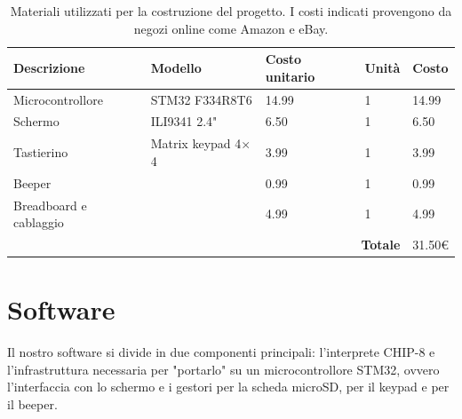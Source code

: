 \documentclass[a4paper]{article}
\begin{document}
    \begin{table}[h] %
        \centering
        \begin{tabular}{|llll|l|}
            \hline
            \multicolumn{1}{|l|}{\textbf{Descrizione}}          & \multicolumn{1}{l|}{\textbf{Modello}}       & \multicolumn{1}{l|}{\textbf{Costo unitario}} & \textbf{Unità} & \textbf{Costo} \\ \hline
            \multicolumn{1}{|l|}{Microcontrollore}       & \multicolumn{1}{l|}{STM32 F334R8T6}         & \multicolumn{1}{l|}{14.99}                   & 1               & 14.99          \\ \hline
            \multicolumn{1}{|l|}{Schermo}                & \multicolumn{1}{l|}{ILI9341 2.4"}           & \multicolumn{1}{l|}{6.50}                    & 1               & 6.50           \\ \hline
            \multicolumn{1}{|l|}{Tastierino}          & \multicolumn{1}{l|}{Matrix keypad 4$\times$4} & \multicolumn{1}{l|}{3.99}                    & 1               & 3.99           \\ \hline
            \multicolumn{1}{|l|}{Beeper}                 & \multicolumn{1}{l|}{}                       & \multicolumn{1}{l|}{0.99}                    & 1               & 0.99           \\ \hline
            \multicolumn{1}{|l|}{Breadboard e cablaggio} & \multicolumn{1}{l|}{}                       & \multicolumn{1}{l|}{4.99}                    & 1               & 4.99           \\ \hline
            \multicolumn{4}{|r|}{\textbf{Totale}}                                                      & 31.50\euro    \\ \hline
        \end{tabular}
        \caption{
            Materiali utilizzati per la costruzione del progetto. I costi indicati provengono da negozi online come Amazon e eBay.
        }
    \end{table}

\section{Software}

Il nostro software si divide in due componenti principali:
l'interprete CHIP-8 e l'infrastruttura necessaria per "portarlo"
su un microcontrollore STM32, ovvero l'interfaccia con lo schermo
e i gestori per la scheda microSD, per il keypad e per il beeper.
\end{document}
